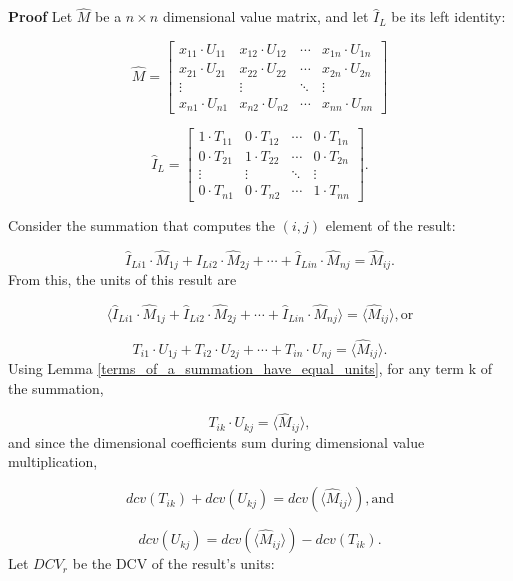 \documentclass[10pt,letterpaper]{article}
\newenvironment{proof}{\noindent\textbf{Proof} }{\qed \newline}
\newcommand{\qed}{\nobreak \ifvmode \relax \else
      \ifdim\lastskip<1.5em \hskip-\lastskip
      \hskip1.5em plus0em minus0.5em \fi \nobreak
      \vrule height0.75em width0.5em depth0.25em\fi}
\numberwithin{equation}{section}
\begin{document}
\begin{proof}Let $\hat M$ be a $n \times n$ dimensional value matrix,
  and let $\hat I_L$ be its left identity:

\[ \hat M = \left[ \begin{matrix} 
  x_{11} \cdot U_{11} & x_{12} \cdot U_{12} & \cdots & x_{1n} \cdot U_{1n} \\
  x_{21} \cdot U_{21} & x_{22} \cdot U_{22} & \cdots & x_{2n} \cdot U_{2n} \\
  \vdots & \vdots & \ddots & \vdots \\
  x_{n1} \cdot U_{n1} & x_{n2} \cdot U_{n2} & \cdots & x_{nn} \cdot U_{nn}
 \end{matrix} \right] \]

\[ \hat I_L = \left[ \begin{matrix} 
  1 \cdot T_{11} & 0 \cdot T_{12} & \cdots & 0 \cdot T_{1n} \\
  0 \cdot T_{21} & 1 \cdot T_{22} & \cdots & 0 \cdot T_{2n} \\
  \vdots & \vdots & \ddots & \vdots \\
  0 \cdot T_{n1} & 0 \cdot T_{n2} & \cdots & 1 \cdot T_{nn}
 \end{matrix} \right] . \]

Consider the summation that computes the $(i, j)$ element of the
result:

\[ \hat I_{Li1} \cdot \hat M_{1j} + \hat I_{Li2} \cdot \hat M_{2j} +
\cdots + \hat I_{Lin} \cdot \hat M_{nj} = \hat M_{ij} . \] From this,
the units of this result are

\[ \langle \hat I_{Li1} \cdot \hat M_{1j} + \hat I_{Li2} \cdot \hat
M_{2j} + \cdots + \hat I_{Lin} \cdot \hat M_{nj} \rangle = \langle
\hat M_{ij} \rangle , \mbox{or} \]

\[ T_{i1} \cdot U_{1j} + T_{i2} \cdot U_{2j} + \cdots + T_{in} \cdot
U_{nj} = \langle \hat M_{ij} \rangle . \] Using Lemma
\ref{terms_of_a_summation_have_equal_units}, for any term k of the
summation,

\[ T_{ik} \cdot U_{kj} = \langle \hat M_{ij} \rangle , \] and since
the dimensional coefficients sum during dimensional value
multiplication,

\begin{equation} \label{basic_equation_1_for_left_identity_ddv_proof}
  dcv(T_{ik}) + dcv(U_{kj}) = dcv( \langle \hat M_{ij} \rangle ) ,
  \mbox{and} \end{equation}

\begin{equation} \label{basic_equation_2_for_left_identity_ddv_proof}
  dcv(U_{kj}) = dcv( \langle \hat M_{ij} \rangle ) - dcv(T_{ik})
  . \end{equation} Let $DCV_r$ be the DCV of the result's units:


\end{proof}
\end{document}
